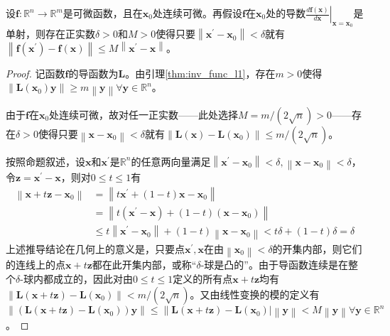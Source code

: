 \documentclass[main.tex]{subfiles}
\begin{document}
\begin{lemma}\label{thm:inv_func_l3}
设$\mathbf{f}:\mathbb{R}^n\rightarrow\mathbb{R}^m$是可微函数，且在$\mathbf{x}_0$处连续可微。再假设$\mathbf{f}$在$\mathbf{x}_0$处的导数$\left.\frac{d\mathbf{f}\left(\mathbf{x}\right)}{d\mathbf{x}}\right|_{\mathbf{x}=\mathbf{x}_0}$是单射，则存在正实数$\delta>0$和$M>0$使得只要$\left\|\mathbf{x}^\prime-\mathbf{x}_0\right\|<\delta$就有$\left\|\mathbf{f}\left(\mathbf{x}^\prime\right)-\mathbf{f}\left(\mathbf{x}\right)\right\|\leq M\left\|\mathbf{x}^\prime-\mathbf{x}\right\|$。
\end{lemma}
\begin{proof}
记函数$\mathbf{f}$的导函数为$\mathbf{L}$。由引理\ref{thm:inv_func_l1}，存在$m>0$使得$\left\|\mathbf{L}\left(\mathbf{x}_0\right)\mathbf{y}\right\|\geq m\left\|\mathbf{y}\right\|\forall\mathbf{y}\in\mathbb{R}^n$。

由于$\mathbf{f}$在$\mathbf{x}_0$处连续可微，故对任一正实数——此处选择$M=m/\left(2\sqrt{n}\right)>0$——存在$\delta>0$使得只要$\left\|\mathbf{x}-\mathbf{x}_0\right\|<\delta$就有$\left\|\mathbf{L}\left(\mathbf{x}\right)-\mathbf{L}\left(\mathbf{x}_0\right)\right\|\leq m/\left(2\sqrt{n}\right)$。

按照命题叙述，设$\mathbf{x}$和$\mathbf{x}^\prime$是$\mathbb{R}^n$的任意两向量满足$\left\|\mathbf{x}^\prime-\mathbf{x}_0\right\|<\delta,\left\|\mathbf{x}-\mathbf{x}_0\right\|<\delta$，令$\mathbf{z}=\mathbf{x}^\prime-\mathbf{x}$，则对$0\leq t\leq 1$有
\begin{align*}
    \left\|\mathbf{x}+t\mathbf{z}-\mathbf{x}_0\right\|&=\left\|t\mathbf{x}^\prime+\left(1-t\right)\mathbf{x}-\mathbf{x}_0\right\|\\
    &=\left\|t\left(\mathbf{x}^\prime-\mathbf{x}\right)+\left(1-t\right)\left(\mathbf{x}-\mathbf{x}_0\right)\right\|\\
    &\leq t\left\|\mathbf{x}^\prime-\mathbf{x}_0\right\|+\left(1-t\right)\left\|\mathbf{x}-\mathbf{x}_0\right\|<t\delta+\left(1-t\right)\delta=\delta
\end{align*}
上述推导结论在几何上的意义是，只要点$\mathbf{x}^\prime,\mathbf{x}$在由$\left\|\mathbf{x}_0\right\|<\delta$的开集内部，则它们的连线上的点$\mathbf{x}+t\mathbf{z}$都在此开集内部，或称“$\delta$-球是凸的”。由于导函数连续是在整个$\delta$-球内都成立的，因此对由$0\leq t\leq 1$定义的所有点$\mathbf{x}+t\mathbf{z}$均有$\left\|\mathbf{L}\left(\mathbf{x}+t\mathbf{z}\right)-\mathbf{L}\left(\mathbf{x}_0\right)\right\|<m/\left(2\sqrt{n}\right)$。又由线性变换的模的定义有$\left\|\left(\mathbf{L}\left(\mathbf{x}+t\mathbf{z}\right)-\mathbf{L}\left(\mathbf{x}_0\right)\right)\mathbf{y}\right\|\leq\left\|\mathbf{L}\left(\mathbf{x}+t\mathbf{z}\right)-\mathbf{L}\left(\mathbf{x}_0\right)\right|\left\|\mathbf{y}\right\|<M\left\|\mathbf{y}\right\|\forall\mathbf{y}\in\mathbb{R}^n$。


\end{proof}
\end{document}
